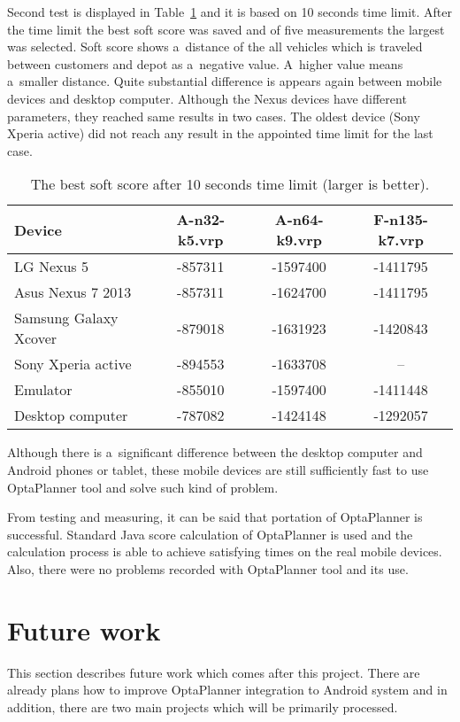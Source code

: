 Second test is displayed in Table~\ref{ScoreLimitTable} and it is based on 10 seconds time limit. After the time limit
the best soft score was saved and of five measurements the largest was selected. Soft score shows a~distance of the all
vehicles which is traveled between customers and depot as a~negative value. A~higher value means a~smaller distance.
Quite substantial difference is appears again between mobile devices and desktop computer. Although the Nexus devices
have different parameters, they reached same results in two cases. The oldest device (Sony Xperia active) did not reach
any result in the appointed time limit for the last case.
\\
\begin{table}[h!]
    \begin{tabular}{|l|c|c|c|}
        \hline
        \textbf{Device} &
        \textbf{A-n32-k5.vrp} &
        \textbf{A-n64-k9.vrp} &
        \textbf{F-n135-k7.vrp} \\ \hline \hline
        LG Nexus 5            & -857311 & -1597400 & -1411795 \\ \hline
        Asus Nexus 7 2013     & -857311 & -1624700 & -1411795 \\ \hline
        Samsung Galaxy Xcover & -879018 & -1631923 & -1420843 \\ \hline
        Sony Xperia active    & -894553 & -1633708 & --       \\ \hline
        Emulator              & -855010 & -1597400 & -1411448 \\ \hline
        Desktop computer      & -787082 & -1424148 & -1292057 \\ \hline
    \end{tabular}
    \centering
    \caption{The best soft score after 10 seconds time limit (larger is better).}
    \label{ScoreLimitTable}
\end{table}

Although there is a~significant difference between the desktop computer and Android phones or tablet, these mobile
devices are still sufficiently fast to use OptaPlanner tool and solve such kind of problem.

From testing and measuring, it can be said that portation of OptaPlanner is successful. Standard Java score calculation
of OptaPlanner is used and the calculation process is able to achieve satisfying times on the real mobile devices. Also,
there were no problems recorded with OptaPlanner tool and its use.

\section{Future work}\label{FutureWorkSection}
This section describes future work which comes after this project. There are already plans how to improve OptaPlanner
integration to Android system and in addition, there are two main projects which will be primarily processed.


